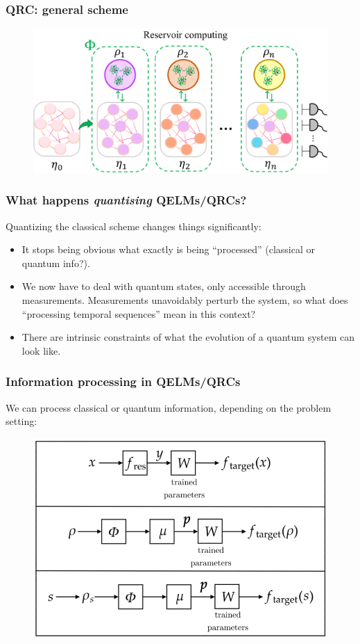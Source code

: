\documentclass{beamer}
\begin{document}
\begin{frame}
\frametitle{QRC: general scheme}

\begin{figure}
\includegraphics[width=\linewidth]{figures/scheme_QRC.png}
\end{figure}

\end{frame}



\begin{frame}
\frametitle{What happens \textit{quantising} QELMs/QRCs?}
Quantizing the classical scheme changes things significantly:
\begin{itemize}
    \item It stops being obvious what exactly is being ``processed'' (classical or quantum info?).
    \item We now have to deal with quantum states, only accessible through measurements. Measurements unavoidably perturb the system, so what does ``processing temporal sequences'' mean in this context?
    \item There are intrinsic constraints of what the evolution of a quantum system can look like.
\end{itemize}
\end{frame}


\begin{frame}
\frametitle{Information processing in QELMs/QRCs}
We can process classical or quantum information, depending on the problem setting:
\begin{figure}
\includegraphics[width=0.7\linewidth]{figures/QRCs processing info.png}
\end{figure}

\end{frame}
\end{document}
